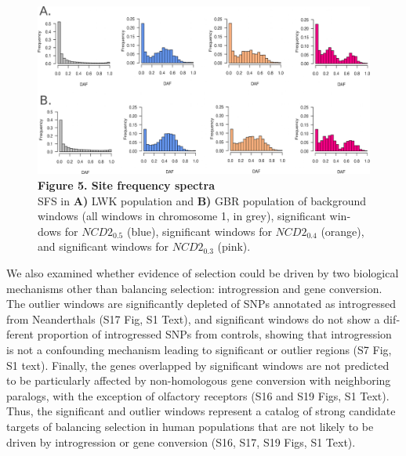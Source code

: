 \begin{refsection}
\begin{otherlanguage}{english}
\begin{figure}
\includegraphics[]{chap2_folder/Figures/Fig5.png}
\caption*{\textbf{Figure 5. Site frequency spectra}\\
SFS in \textbf{A)} LWK population and \textbf{B)} GBR population of background windows (all windows in chromosome 1, in grey), significant windows for $NCD2_{0.5}$ (blue), significant windows for $NCD2_{0.4}$ (orange), and significant windows for $NCD2_{0.3}$ (pink).}
\end{figure}
We also examined whether evidence of selection could be driven by two biological mechanisms other than balancing selection: introgression and gene conversion. The outlier windows are significantly depleted of SNPs annotated as introgressed from Neanderthals (S17 Fig, S1 Text), and significant windows do not show a different proportion of introgressed SNPs from controls, showing that introgression is not a confounding mechanism leading to significant or outlier regions (S7 Fig, S1 text). Finally, the genes overlapped by significant windows are not predicted to be particularly affected by non-homologous gene conversion with neighboring paralogs, with the exception of olfactory receptors (S16 and S19 Figs, S1 Text). Thus, the significant and outlier windows represent a catalog of strong candidate targets of balancing selection in human populations that are not likely to be driven by introgression or gene conversion (S16, S17, S19 Figs, S1 Text).



\end{otherlanguage}
\end{refsection}
